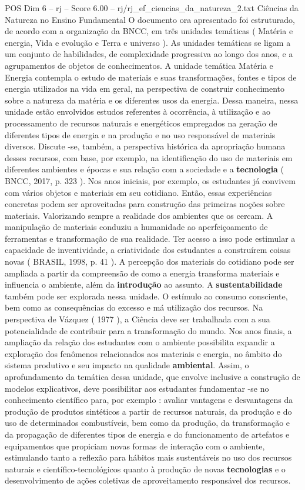 \begin{textsample}{POS Dim 6 – rj – Score 6.00 – rj/rj\_ef\_ciencias\_da\_natureza\_2.txt}  \label{ex:f6_pos_274}
Ciências da Natureza no Ensino Fundamental O documento ora apresentado foi estruturado, de acordo com a organização da BNCC, em três unidades temáticas ( Matéria e energia, Vida e evolução e Terra e universo ).
As unidades temáticas se ligam a um conjunto de habilidades, de complexidade progressiva ao longo dos anos, e a agrupamentos de objetos de conhecimentos.
A unidade temática Matéria e Energia contempla o estudo de materiais e suas transformações, fontes e tipos de energia utilizados na vida em geral, na perspectiva de construir conhecimento sobre a natureza da matéria e os diferentes usos da energia.
Dessa maneira, nessa unidade estão envolvidos estudos referentes à ocorrência, à utilização e ao processamento de recursos naturais e energéticos empregados na geração de diferentes tipos de energia e na produção e no uso responsável de materiais diversos.
Discute -se, também, a perspectiva histórica da apropriação humana desses recursos, com base, por exemplo, na identificação do uso de materiais em diferentes ambientes e épocas e sua relação com a sociedade e a \textbf{tecnologia} ( BNCC, 2017, p. 323 ).
Nos anos iniciais, por exemplo, os estudantes já convivem com vários objetos e materiais em seu cotidiano.
Então, essas experiências concretas podem ser aproveitadas para construção das primeiras noções sobre materiais.
Valorizando sempre a realidade dos ambientes que os cercam.
A manipulação de materiais conduziu a humanidade ao aperfeiçoamento de ferramentas e transformação de sua realidade.
Ter acesso a isso pode estimular a capacidade de inventividade, a criatividade dos estudantes a construírem coisas novas ( BRASIL, 1998, p. 41 ).
A percepção dos materiais do cotidiano pode ser ampliada a partir da compreensão de como a energia transforma materiais e influencia o ambiente, além da \textbf{introdução} ao assunto.
A \textbf{sustentabilidade} também pode ser explorada nessa unidade.
O estímulo ao consumo consciente, bem como as consequências do excesso e má utilização dos recursos.
Na perspectiva de Vázquez ( 1977 ), a Ciência deve ser trabalhada com a sua potencialidade de contribuir para a transformação do mundo.
Nos anos finais, a ampliação da relação dos estudantes com o ambiente possibilita expandir a exploração dos fenômenos relacionados aos materiais e energia, no âmbito do sistema produtivo e seu impacto na qualidade \textbf{ambiental}.
Assim, o aprofundamento da temática dessa unidade, que envolve inclusive a construção de modelos explicativos, deve possibilitar aos estudantes fundamentar -se no conhecimento científico para, por exemplo : avaliar vantagens e desvantagens da produção de produtos sintéticos a partir de recursos naturais, da produção e do uso de determinados combustíveis, bem como da produção, da transformação e da propagação de diferentes tipos de energia e do funcionamento de artefatos e equipamentos que propiciam novas formas de interação com o ambiente, estimulando tanto a reflexão para hábitos mais sustentáveis no uso dos recursos naturais e científico-tecnológicos quanto à produção de novas \textbf{tecnologias} e o desenvolvimento de ações coletivas de aproveitamento responsável dos recursos.

\end{textsample}
